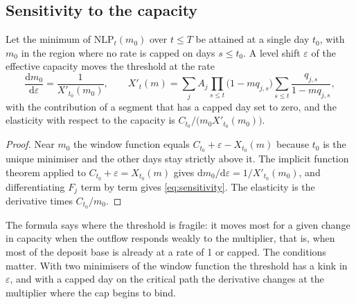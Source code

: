 \subsection{Sensitivity to the capacity}

\begin{proposition}[Sensitivity]
\label{prop:sensitivity}
Let the minimum of $\mathrm{NLP}_t(m_0)$ over $t\le T$ be attained at a single day $t_0$, with $m_0$ in the region where no rate is capped on days $s\le t_0$. A level shift $\varepsilon$ of the effective capacity moves the threshold at the rate
\begin{equation}
\frac{\mathrm d m_0}{\mathrm d\varepsilon}=\frac{1}{X'_{t_0}(m_0)},\qquad X'_{t}(m)=\sum_jA_j\prod_{s\le t}\bigl(1-mq_{j,s}\bigr)\sum_{s\le t}\frac{q_{j,s}}{1-mq_{j,s}},
\label{eq:sensitivity}
\end{equation}
with the contribution of a segment that has a capped day set to zero, and the elasticity with respect to the capacity is $C_{t_0}/\bigl(m_0X'_{t_0}(m_0)\bigr)$.
\end{proposition}
\begin{proof}
Near $m_0$ the window function equals $C_{t_0}+\varepsilon-X_{t_0}(m)$ because $t_0$ is the unique minimiser and the other days stay strictly above it. The implicit function theorem applied to $C_{t_0}+\varepsilon=X_{t_0}(m)$ gives $\mathrm dm_0/\mathrm d\varepsilon=1/X'_{t_0}(m_0)$, and differentiating $F_j$ term by term gives \cref{eq:sensitivity}. The elasticity is the derivative times $C_{t_0}/m_0$.
\end{proof}
The formula says where the threshold is fragile: it moves most for a given change in capacity when the outflow responds weakly to the multiplier, that is, when most of the deposit base is already at a rate of 1 or capped. The conditions matter. With two minimisers of the window function the threshold has a kink in $\varepsilon$, and with a capped day on the critical path the derivative changes at the multiplier where the cap begins to bind.
